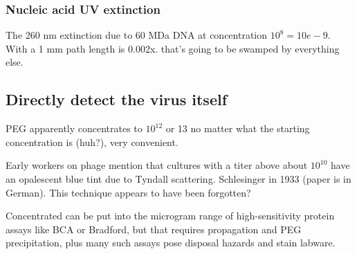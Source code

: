 \documentclass[paper.tex]{subfiles}
\begin{document}
\subsubsection{Nucleic acid UV extinction }


The 260 nm extinction due to 60 MDa DNA at concentration $10^8 = 10e-9$. With a 1 mm path length is 0.002x. that's going to be swamped by everything else.


\subsection{Directly detect the virus itself}

PEG apparently concentrates to $10^{12}$ or 13 no matter what the starting concentration is (huh?), very convenient.

Early workers on phage mention\cite{ADSORPTION1940}  that cultures with a titer above about $10^10$ have an opalescent blue tint due to Tyndall scattering. Schlesinger in 1933 \cite{Beobachtung1933} (paper is in German). This technique appears to have been forgotten?



Concentrated can be put into the microgram range of high-sensitivity protein assays like BCA or Bradford, but that requires propagation and PEG precipitation, plus many such assays pose disposal hazards and stain labware. 
\end{document}
